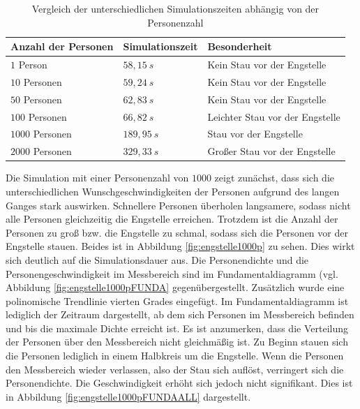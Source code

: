 \begin{table}[htpb]
	\centering
	\begin{tabular}{lll}
		Anzahl der Personen & Simulationszeit  &  Besonderheit\\ \hline
		$1$ Person & $58,15\ s$  &  Kein Stau vor der Engstelle\\ 
		$10$ Personen & $59,24\ s$  &  Kein Stau vor der Engstelle\\ 
		$50$ Personen & $62,83\ s$  &  Kein Stau vor der Engstelle\\ 
		$100$ Personen & $66,82\ s$  &  Leichter Stau vor der Engstelle\\ 
		$1000$ Personen & $189,95\ s$  &  Stau vor der Engstelle\\ 
		$2000$ Personen & $329,33\ s$  &  Großer Stau vor der Engstelle\\ 
 
	\end{tabular}
	\caption{Vergleich der unterschiedlichen Simulationszeiten abhängig von der Personenzahl}
	\label{tab:SimuZeitEngstelle}
\end{table}

Die Simulation mit einer Personenzahl von $1000$ zeigt zunächst, dass sich die unterschiedlichen Wunschgeschwindigkeiten der Personen aufgrund des langen Ganges stark auswirken. Schnellere Personen überholen langsamere, sodass nicht alle Personen gleichzeitig die Engstelle erreichen. Trotzdem ist die Anzahl der Personen zu groß bzw. die Engstelle zu schmal, sodass sich die Personen vor der Engstelle stauen. Beides ist in Abbildung \ref{fig:engstelle1000p} zu sehen. Dies wirkt sich deutlich auf die Simulationsdauer aus. Die Personendichte und die Personengeschwindigkeit im Messbereich sind im Fundamentaldiagramm (vgl. Abbildung \ref{fig:engstelle1000pFUNDA} gegenübergestellt. Zusätzlich wurde eine polinomische Trendlinie vierten Grades eingefügt. Im Fundamentaldiagramm ist lediglich der Zeitraum dargestellt, ab dem sich Personen im Messbereich befinden und bis die maximale Dichte erreicht ist. Es ist anzumerken, dass die Verteilung der Personen über den Messbereich nicht gleichmäßig ist. Zu Beginn stauen sich die Personen lediglich in einem Halbkreis um die Engstelle. Wenn die Personen den Messbereich wieder verlassen, also der Stau sich auflöst, verringert sich die Personendichte. Die Geschwindigkeit erhöht sich jedoch nicht signifikant. Dies ist in Abbildung \ref{fig:engstelle1000pFUNDAALL} dargestellt.

